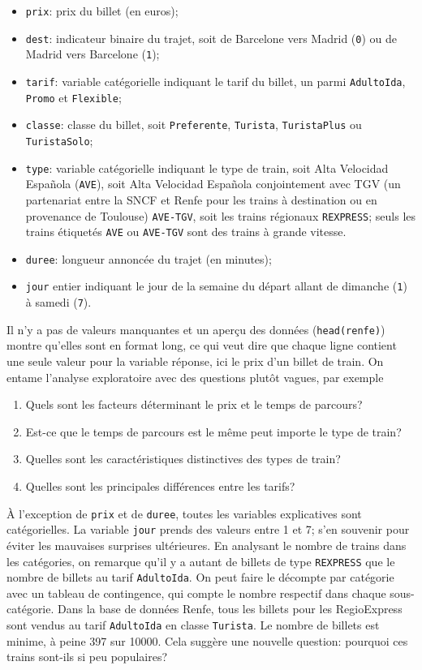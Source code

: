 \documentclass[
  11pt,
  letterpaper,
]{book}
\providecommand{\tightlist}{%
  \setlength{\itemsep}{0pt}\setlength{\parskip}{0pt}}
\theoremstyle{definition}
\theoremstyle{definition}
\theoremstyle{definition}
\theoremstyle{definition}
\theoremstyle{remark}
\begin{document}
\begin{itemize}
\tightlist
\item
  \texttt{prix}: prix du billet (en euros);
\item
  \texttt{dest}: indicateur binaire du trajet, soit de Barcelone vers Madrid (\texttt{0}) ou de Madrid vers Barcelone (\texttt{1});
\item
  \texttt{tarif}: variable catégorielle indiquant le tarif du billet, un parmi \texttt{AdultoIda}, \texttt{Promo} et \texttt{Flexible};
\item
  \texttt{classe}: classe du billet, soit \texttt{Preferente}, \texttt{Turista}, \texttt{TuristaPlus} ou \texttt{TuristaSolo};
\item
  \texttt{type}: variable catégorielle indiquant le type de train, soit Alta Velocidad Española (\texttt{AVE}), soit Alta Velocidad Española conjointement avec TGV (un partenariat entre la SNCF et Renfe pour les trains à destination ou en provenance de Toulouse) \texttt{AVE-TGV}, soit les trains régionaux \texttt{REXPRESS}; seuls les trains étiquetés \texttt{AVE} ou \texttt{AVE-TGV} sont des trains à grande vitesse.
\item
  \texttt{duree}: longueur annoncée du trajet (en minutes);
\item
  \texttt{jour} entier indiquant le jour de la semaine du départ allant de dimanche (\texttt{1}) à samedi (\texttt{7}).
\end{itemize}

Il n'y a pas de valeurs manquantes et un aperçu des données (\texttt{head(renfe)}) montre qu'elles sont en format long, ce qui veut dire que chaque ligne contient une seule valeur pour la variable réponse, ici le prix d'un billet de train. On entame l'analyse exploratoire avec des questions plutôt vagues, par exemple

\begin{enumerate}
\def\labelenumi{\arabic{enumi}.}
\tightlist
\item
  Quels sont les facteurs déterminant le prix et le temps de parcours?
\item
  Est-ce que le temps de parcours est le même peut importe le type de train?
\item
  Quelles sont les caractéristiques distinctives des types de train?
\item
  Quelles sont les principales différences entre les tarifs?
\end{enumerate}

À l'exception de \texttt{prix} et de \texttt{duree}, toutes les variables explicatives sont catégorielles. La variable \texttt{jour} prends des valeurs entre 1 et 7; s'en souvenir pour éviter les mauvaises surprises ultérieures.
En analysant le nombre de trains dans les catégories, on remarque qu'il y a autant de billets de type \texttt{REXPRESS} que le nombre de billets au tarif \texttt{AdultoIda}. On peut faire le décompte par catégorie avec un tableau de contingence, qui compte le nombre respectif dans chaque sous-catégorie. Dans la base de données Renfe, tous les billets pour les RegioExpress sont vendus au tarif \texttt{AdultoIda} en classe \texttt{Turista}. Le nombre de billets est minime, à peine 397 sur 10000. Cela suggère une nouvelle question: pourquoi ces trains sont-ils si peu populaires?
\end{document}
